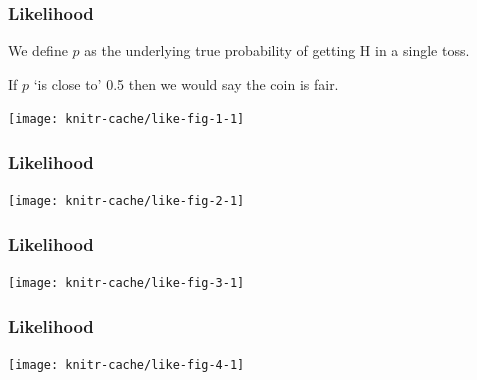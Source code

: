 \begin{frame}
\frametitle{Likelihood}

We define $p$ as the underlying true probability of getting H in a single toss.

If $p$ `is close to' 0.5 then we would say the coin is fair.

\howlikely
\begin{center}
\begin{knitrout}
\color{fgcolor}
\texttt{[image: knitr-cache/like-fig-1-1]}

\end{knitrout}
\end{center}

\end{frame}


\begin{frame}
\frametitle{Likelihood}

\howlikely
\begin{center}
\begin{knitrout}
\color{fgcolor}
\texttt{[image: knitr-cache/like-fig-2-1]}

\end{knitrout}
\end{center}
\end{frame}


\begin{frame}
\frametitle{Likelihood}

\howlikely
\begin{center}
\begin{knitrout}
\color{fgcolor}
\texttt{[image: knitr-cache/like-fig-3-1]}

\end{knitrout}
\end{center}

\end{frame}


\begin{frame}
\frametitle{Likelihood}

\howlikely
\begin{center}
\begin{knitrout}
\color{fgcolor}
\texttt{[image: knitr-cache/like-fig-4-1]}

\end{knitrout}
\end{center}
\end{frame}

